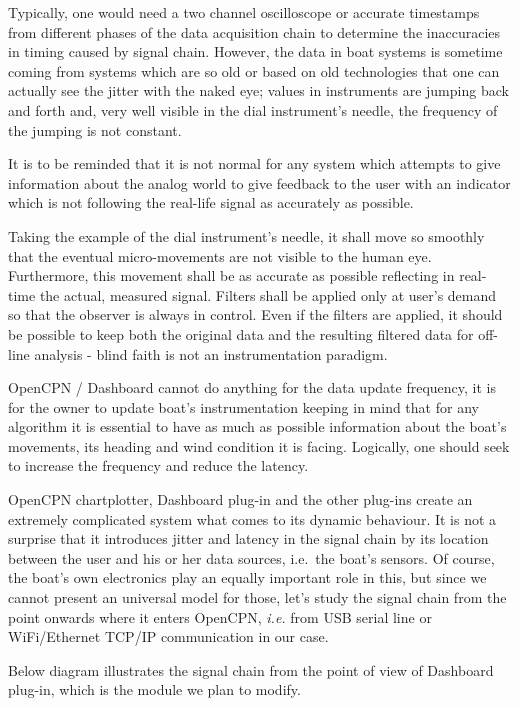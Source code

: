 \documentclass[11pt]{article}
\begin{document}
    Typically, one would need a two channel oscilloscope or accurate
timestamps from different phases of the data acquisition chain to
determine the inaccuracies in timing caused by signal chain. However,
the data in boat systems is sometime coming from systems which are so
old or based on old technologies that one can actually see the jitter
with the naked eye; values in instruments are jumping back and forth
and, very well visible in the dial instrument's needle, the frequency of
the jumping is not constant.

    It is to be reminded that it is not normal for any system which attempts
to give information about the analog world to give feedback to the user
with an indicator which is not following the real-life signal as
accurately as possible.

    Taking the example of the dial instrument's needle, it shall move so
smoothly that the eventual micro-movements are not visible to the human
eye. Furthermore, this movement shall be as accurate as possible
reflecting in real-time the actual, measured signal. Filters shall be
applied only at user's demand so that the observer is always in control.
Even if the filters are applied, it should be possible to keep both the
original data and the resulting filtered data for off-line analysis -
blind faith is not an instrumentation paradigm.

    OpenCPN / Dashboard cannot do anything for the data update frequency, it
is for the owner to update boat's instrumentation keeping in mind that
for any algorithm it is essential to have as much as possible
information about the boat's movements, its heading and wind condition
it is facing. Logically, one should seek to increase the frequency and
reduce the latency.

    OpenCPN chartplotter, Dashboard plug-in and the other plug-ins create an
extremely complicated system what comes to its dynamic behaviour. It is
not a surprise that it introduces jitter and latency in the signal chain
by its location between the user and his or her data sources, i.e.~the
boat's sensors. Of course, the boat's own electronics play an equally
important role in this, but since we cannot present an universal model
for those, let's study the signal chain from the point onwards where it
enters OpenCPN, \emph{i.e.} from USB serial line or WiFi/Ethernet TCP/IP
communication in our case.

    Below diagram illustrates the signal chain from the point of view of
Dashboard plug-in, which is the module we plan to modify.
\end{document}
